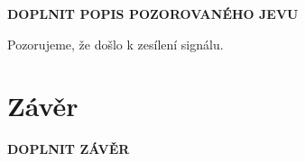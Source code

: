 \documentclass[a4paper, czech]{article}
\begin{document}
\textbf{DOPLNIT POPIS POZOROVANÉHO JEVU}

Pozorujeme, že došlo k zesílení signálu. %

\section{Závěr}

\textbf{DOPLNIT ZÁVĚR}
\end{document}
